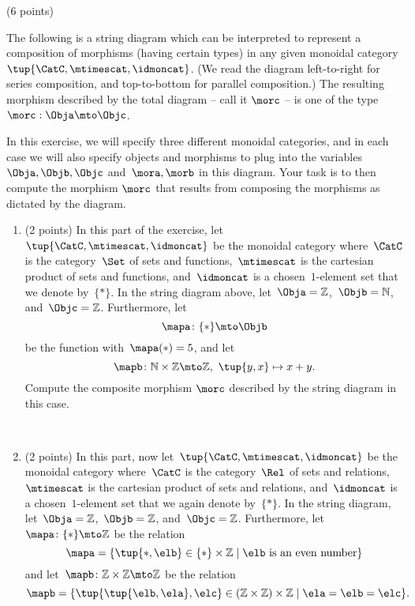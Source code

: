 \documentclass[paper=8.125in:10.250in,pagesize=pdftex,
    headinclude=false,footinclude=false,oneside,egregdoesnotlikesansseriftitles]{kaobook}
\begin{document}
\begin{gradedexercise}\label{ex:StringDiagrams} (6 points) 

The following is a string diagram which can be interpreted to represent a composition of morphisms (having certain types) in any given monoidal category~$\tup{\CatC,\mtimescat,\idmoncat}$. (We read the diagram left-to-right for series composition, and top-to-bottom for parallel composition.) The resulting morphism described by the total diagram -- call it $\morc$ -- is one of the type~$\morc : \Obja \mto \Objc$.

\begin{center}
    \label{eq:ExamStringDiagram1}
\end{center}

In this exercise, we will specify three different monoidal categories, and in each case we will also specify objects and morphisms to plug into the variables~$\Obja, \Objb, \Objc$ and~$\mora, \morb$ in this diagram.
Your task is to then compute the morphism $\morc$ that results from composing the morphisms as dictated by the diagram.

\begin{enumerate}
\item (2 points) In this part of the exercise, let~$\tup{\CatC,\mtimescat,\idmoncat}$ be the monoidal category where~$\CatC$ is the category~$\Set$ of sets and functions,~$\mtimescat$ is the cartesian product of sets and functions, and~$\idmoncat$ is a chosen~$1$-element set that we denote by~$\{ * \}$.
In the string diagram above, let~$\Obja = \mathbb{Z}$,~$\Objb = \mathbb{N}$, and~$\Objc = \mathbb{Z}$.
Furthermore, let~
$$\mapa\colon \{ * \} \mto \Objb$$ 
be the function with~$\mapa(*) = 5$, and let~
$$\mapb \colon \mathbb{N} \times \mathbb{Z} \mto \mathbb{Z}, \ \tup{y, x} \mapsto x + y.$$
Compute the composite morphism $\morc$ described by the string diagram in this case.

\

\item (2 points) In this part, now let~$\tup{\CatC,\mtimescat,\idmoncat}$ be the monoidal category where~$\CatC$ is the category~$\Rel$ of sets and relations,~$\mtimescat$ is the cartesian product of sets and relations, and~$\idmoncat$ is a chosen~$1$-element set that we again denote by~$\{ * \}$.
In the string diagram, let~$\Obja = \mathbb{Z}$,~$\Objb = \mathbb{Z}$, and~$\Objc = \mathbb{Z}$.
Furthermore, let~$\mapa\colon \{ * \} \mto \mathbb{Z}$ be the relation
\begin{equation*}
\mapa = \{ \tup{*, \elb} \in \{ *\} \times \mathbb{Z} \mid \elb \text{ is an even number} \}
\end{equation*}
and let~$\mapb \colon \mathbb{Z} \times \mathbb{Z} \mto \mathbb{Z}$ be the relation
\begin{equation*}
\mapb = \{ \tup{\tup{\elb, \ela}, \elc} \in (\mathbb{Z} \times \mathbb{Z}) \times \mathbb{Z} \mid \ela = \elb = \elc \}.
\end{equation*}


\end{enumerate}
\end{gradedexercise}
\end{document}
